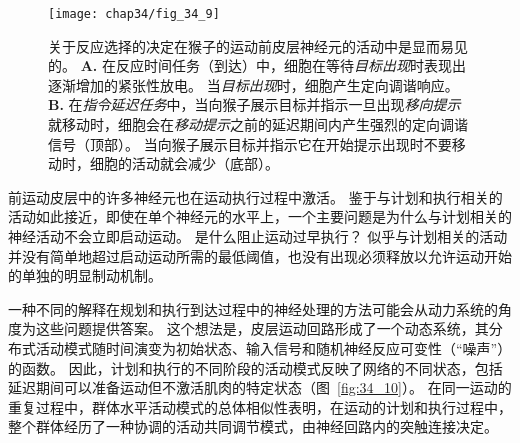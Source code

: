 \begin{figure}[htbp]
	\centering
	\texttt{[image: chap34/fig\_34\_9]}
	\caption{关于反应选择的决定在猴子的运动前皮层神经元的活动中是显而易见的\cite{crammond2000prior}。
		\textbf{A.} 在反应时间任务（到达）中，细胞在等待\textit{目标出现}时表现出逐渐增加的紧张性放电。
		当\textit{目标出现}时，细胞产生定向调谐响应。
		\textbf{B.} 在\textit{指令延迟任务}中，当向猴子展示目标并指示一旦出现\textit{移向提示}就移动时，细胞会在\textit{移动提示}之前的延迟期间内产生强烈的定向调谐信号（顶部）。
		当向猴子展示目标并指示它在开始提示出现时不要移动时，细胞的活动就会减少（底部）。}
	\label{fig:34_9}
\end{figure}


前运动皮层中的许多神经元也在运动执行过程中激活。
鉴于与计划和执行相关的活动如此接近，即使在单个神经元的水平上，一个主要问题是为什么与计划相关的神经活动不会立即启动运动。
是什么阻止运动过早执行？
似乎与计划相关的活动并没有简单地超过启动运动所需的最低阈值，也没有出现必须释放以允许运动开始的单独的明显制动机制。


一种不同的解释在规划和执行到达过程中的神经处理的方法可能会从动力系统的角度为这些问题提供答案。
这个想法是，皮层运动回路形成了一个动态系统，其分布式活动模式随时间演变为初始状态、输入信号和随机神经反应可变性（“噪声”）的函数。
因此，计划和执行的不同阶段的活动模式反映了网络的不同状态，包括延迟期间可以准备运动但不激活肌肉的特定状态（图~\ref{fig:34_10}）。
在同一运动的重复过程中，群体水平活动模式的总体相似性表明，在运动的计划和执行过程中，整个群体经历了一种协调的活动共同调节模式，由神经回路内的突触连接决定。



